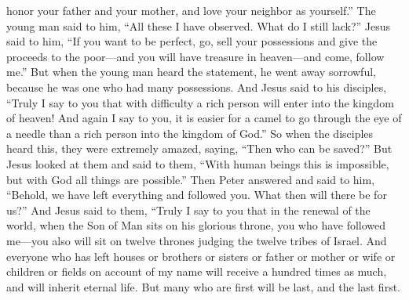 \begin{biblechapter}
\verse honor your father and your mother, and love your neighbor as yourself.”
\verse The young man said to him, “All these I have observed. What do I still lack?”
\verse Jesus said to him, “If you want to be perfect, go, sell your possessions and give the proceeds to the poor—and you will have treasure in heaven—and come, follow me.”
\verse But when the young man heard the statement, he went away sorrowful, because he was one who had many possessions.
\verse And Jesus said to his disciples, “Truly I say to you that with difficulty a rich person will enter into the kingdom of heaven!
\verse And again I say to you, it is easier for a camel to go through the eye of a needle than a rich person into the kingdom of God.”
\verse So when the disciples heard this, they were extremely amazed, saying, “Then who can be saved?”
\verse But Jesus looked at them and said to them, “With human beings this is impossible, but with God all things are possible.”
\verse Then Peter answered and said to him, “Behold, we have left everything and followed you. What then will there be for us?”
\verse And Jesus said to them, “Truly I say to you that in the renewal of the world, when the Son of Man sits on his glorious throne, you who have followed me—you also will sit on twelve thrones judging the twelve tribes of Israel.
\verse And everyone who has left houses or brothers or sisters or father or mother or wife or children or fields on account of my name will receive a hundred times as much, and will inherit eternal life.
\verse But many who are first will be last, and the last first.
\end{biblechapter}

